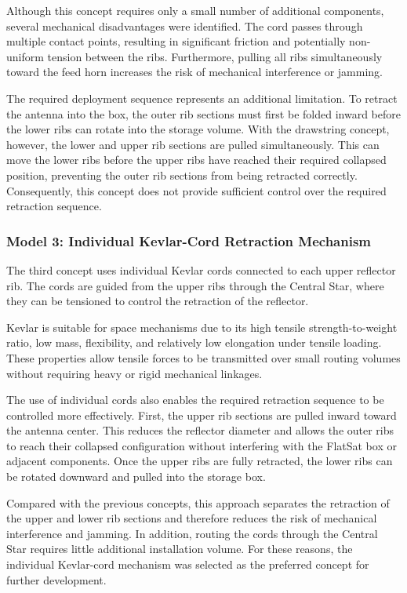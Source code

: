 Although this concept requires only a small number of additional components, several mechanical disadvantages were identified. The cord passes through multiple contact points, resulting in significant friction and potentially non-uniform tension between the ribs. Furthermore, pulling all ribs simultaneously toward the feed horn increases the risk of mechanical interference or jamming.

The required deployment sequence represents an additional limitation. To retract the antenna into the box, the outer rib sections must first be folded inward before the lower ribs can rotate into the storage volume. With the drawstring concept, however, the lower and upper rib sections are pulled simultaneously. This can move the lower ribs before the upper ribs have reached their required collapsed position, preventing the outer rib sections from being retracted correctly. Consequently, this concept does not provide sufficient control over the required retraction sequence.

\subsubsection{Model 3: Individual Kevlar-Cord Retraction Mechanism} \label{sec:Model3}

The third concept uses individual Kevlar cords connected to each upper reflector rib. The cords are guided from the upper ribs through the Central Star, where they can be tensioned to control the retraction of the reflector.

Kevlar is suitable for space mechanisms due to its high tensile strength-to-weight ratio, low mass, flexibility, and relatively low elongation under tensile loading. These properties allow tensile forces to be transmitted over small routing volumes without requiring heavy or rigid mechanical linkages.

The use of individual cords also enables the required retraction sequence to be controlled more effectively. First, the upper rib sections are pulled inward toward the antenna center. This reduces the reflector diameter and allows the outer ribs to reach their collapsed configuration without interfering with the FlatSat box or adjacent components. Once the upper ribs are fully retracted, the lower ribs can be rotated downward and pulled into the storage box.

Compared with the previous concepts, this approach separates the retraction of the upper and lower rib sections and therefore reduces the risk of mechanical interference and jamming. In addition, routing the cords through the Central Star requires little additional installation volume. For these reasons, the individual Kevlar-cord mechanism was selected as the preferred concept for further development.



